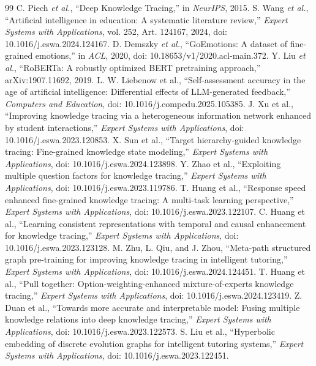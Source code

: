 \begin{thebibliography}{99}
 C. Piech \emph{et al.}, ``Deep Knowledge Tracing,'' in \emph{NeurIPS}, 2015.
 S. Wang \emph{et al.}, ``Artificial intelligence in education: A systematic literature review,'' \emph{Expert Systems with Applications}, vol. 252, Art. 124167, 2024, doi: 10.1016/j.eswa.2024.124167.
 D. Demszky \emph{et al.}, ``GoEmotions: A dataset of fine-grained emotions,'' in \emph{ACL}, 2020, doi: 10.18653/v1/2020.acl-main.372.
 Y. Liu \emph{et al.}, ``RoBERTa: A robustly optimized BERT pretraining approach,'' arXiv:1907.11692, 2019.
 L. W. Liebenow et al., ``Self-assessment accuracy in the age of artificial intelligence: Differential effects of LLM-generated feedback,'' \emph{Computers and Education}, doi: 10.1016/j.compedu.2025.105385.
 J. Xu et al., ``Improving knowledge tracing via a heterogeneous information network enhanced by student interactions,'' \emph{Expert Systems with Applications}, doi: 10.1016/j.eswa.2023.120853.
 X. Sun et al., ``Target hierarchy-guided knowledge tracing: Fine-grained knowledge state modeling,'' \emph{Expert Systems with Applications}, doi: 10.1016/j.eswa.2024.123898.
 Y. Zhao et al., ``Exploiting multiple question factors for knowledge tracing,'' \emph{Expert Systems with Applications}, doi: 10.1016/j.eswa.2023.119786.
 T. Huang et al., ``Response speed enhanced fine-grained knowledge tracing: A multi-task learning perspective,'' \emph{Expert Systems with Applications}, doi: 10.1016/j.eswa.2023.122107.
 C. Huang et al., ``Learning consistent representations with temporal and causal enhancement for knowledge tracing,'' \emph{Expert Systems with Applications}, doi: 10.1016/j.eswa.2023.123128.
 M. Zhu, L. Qiu, and J. Zhou, ``Meta-path structured graph pre-training for improving knowledge tracing in intelligent tutoring,'' \emph{Expert Systems with Applications}, doi: 10.1016/j.eswa.2024.124451.
 T. Huang et al., ``Pull together: Option-weighting-enhanced mixture-of-experts knowledge tracing,'' \emph{Expert Systems with Applications}, doi: 10.1016/j.eswa.2024.123419.
 Z. Duan et al., ``Towards more accurate and interpretable model: Fusing multiple knowledge relations into deep knowledge tracing,'' \emph{Expert Systems with Applications}, doi: 10.1016/j.eswa.2023.122573.
 S. Liu et al., ``Hyperbolic embedding of discrete evolution graphs for intelligent tutoring systems,'' \emph{Expert Systems with Applications}, doi: 10.1016/j.eswa.2023.122451.

\end{thebibliography}
